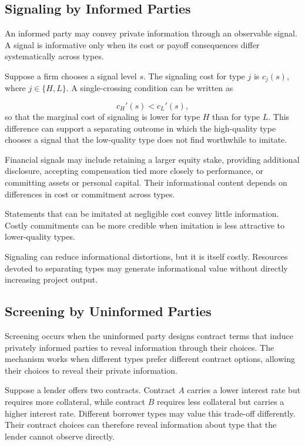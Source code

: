 \subsection{Signaling by Informed Parties}

An informed party may convey private information through an observable signal. A signal is informative only when its cost or payoff consequences differ systematically across types.

Suppose a firm chooses a signal level $s$. The signaling cost for type $j$ is $c_j(s)$, where $j\in\{H,L\}$. A single-crossing condition can be written as

\begin{equation}
c_H'(s)<c_L'(s),
\label{eq:ch3-single-crossing}
\end{equation}
so that the marginal cost of signaling is lower for type $H$ than for type $L$. This difference can support a separating outcome in which the high-quality type chooses a signal that the low-quality type does not find worthwhile to imitate.

Financial signals may include retaining a larger equity stake, providing additional disclosure, accepting compensation tied more closely to performance, or committing assets or personal capital. Their informational content depends on differences in cost or commitment across types.

Statements that can be imitated at negligible cost convey little information. Costly commitments can be more credible when imitation is less attractive to lower-quality types.

Signaling can reduce informational distortions, but it is itself costly. Resources devoted to separating types may generate informational value without directly increasing project output.

\subsection{Screening by Uninformed Parties}

Screening occurs when the uninformed party designs contract terms that induce privately informed parties to reveal information through their choices. The mechanism works when different types prefer different contract options, allowing their choices to reveal their private information.

Suppose a lender offers two contracts. Contract $A$ carries a lower interest rate but requires more collateral, while contract $B$ requires less collateral but carries a higher interest rate. Different borrower types may value this trade-off differently. Their contract choices can therefore reveal information about type that the lender cannot observe directly.

